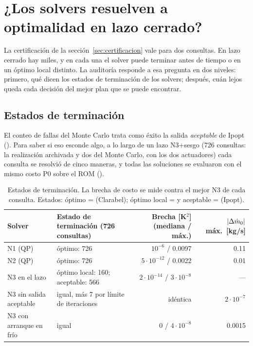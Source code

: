 
\section{¿Los solvers resuelven a optimalidad en lazo cerrado?}\label{sec:auditoria}
La certificación de la sección~\ref{sec:certificacion} vale para dos consultas. En lazo
cerrado hay miles, y en cada una el solver puede terminar antes de tiempo o en un óptimo local
distinto. La auditoría responde a esa pregunta en dos niveles: primero, qué dicen los estados
de terminación de los solvers; después, cuán lejos queda cada decisión del mejor plan que se
puede encontrar.

\subsection{Estados de terminación}
El conteo de fallas del Monte Carlo trata como éxito la salida \emph{aceptable} de Ipopt
(). Para saber si eso esconde algo, a lo largo de un lazo
N3+sesgo (726 consultas: la realización archivada y dos del Monte Carlo, con los dos
actuadores) cada consulta se resolvió de cinco maneras, y todas las soluciones se evaluaron
con el mismo costo P0 sobre el ROM ().

\begin{table}[H]\centering\footnotesize\setlength{\tabcolsep}{4pt}
\begin{tabularx}{\linewidth}{@{}l Y r r@{}}\toprule
Solver & Estado de terminación (726 consultas) & Brecha [K$^2$] (mediana / máx.) & $|\Delta\dot m_0|$ máx.\ [kg/s]\\\midrule
N1 (QP) & óptimo: 726 & $10^{-6}$ / 0.0097 & 0.11\\
N2 (QP) & óptimo: 726 & $5\cdot10^{-12}$ / 0.0022 & 0.01\\
N3 en el lazo & óptimo local: 160; aceptable: 566 & $2\cdot10^{-14}$ / $3\cdot10^{-8}$ & ---\\
N3 sin salida aceptable & igual, más 7 por límite de iteraciones & idéntica & $2\cdot10^{-7}$\\
N3 con arranque en frío & igual & 0 / $4\cdot10^{-8}$ & 0.0015\\\bottomrule
\end{tabularx}
\caption{Estados de terminación. La brecha de costo se mide contra el mejor N3 de cada
consulta. Estados: óptimo =  (Clarabel); óptimo local = 
y aceptable =  (Ipopt).}
\end{table}

